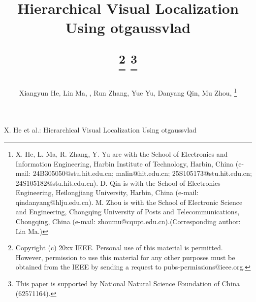 \documentclass[journal]{IEEEtran}
\begin{document}





\title{Hierarchical Visual Localization Using otgaussvlad%
	
	\thanks{Copyright (c) 20xx IEEE. Personal use of this material is permitted. However, permission to use this material for any other purposes must be obtained from the IEEE by sending a request to pubs-permissions@ieee.org.}
	\thanks{This paper is supported by National Natural Science Foundation of China (62571164). }}

\author{Xiangyun He, Lin Ma, , Run Zhang, Yue Yu, Danyang Qin, Mu Zhou, 
	\thanks{X. He, L. Ma, R. Zhang, Y. Yu are with the School of Electronics and Information Engineering, Harbin Institute of Technology, Harbin, China (e-mail: 24B305050@stu.hit.edu.cn; malin@hit.edu.cn; 25S105173@stu.hit.edu.cn; 24S105182@stu.hit.edu.cn). D. Qin is with the School of Electronics Engineering, Heilongjiang University, Harbin, China (e-mail: qindanyang@hlju.edu.cn). M. Zhou is with the School of Electronic Science and Engineering, Chongqing University of Posts and Telecommunications, Chongqing, China (e-mail: zhoumu@cqupt.edu.cn).(Corresponding author: Lin Ma.)}
	
	
}


{X. He et al.: Hierarchical Visual Localization Using otgaussvlad}
\end{document}
